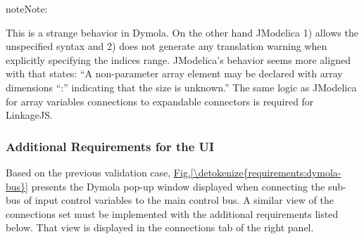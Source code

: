 \documentclass[letterpaper,10pt, openany,english]{sphinxmanual}
\begin{document}
\begin{sphinxadmonition}{note}{Note:}
\begin{sphinxVerbatim}[commandchars=\\\{\}]
 \PYG{p}{[}\PYG{p}{]}

  
\PYG{p}{[}\PYG{p}{]}  
\PYG{p}{[}\PYG{p}{]}  
\PYG{p}{[}\PYG{p}{]} 
\PYG{p}{[}\PYG{p}{]} 
\end{sphinxVerbatim}

This is a strange behavior in Dymola. On the other hand JModelica 1) allows the unspecified \sphinxcode{\sphinxupquote{{[}:{]}}} syntax and 2) does not generate any translation warning when explicitly specifying the indices range.
JModelica’s behavior seems more aligned with   that states: “A non-parameter array element may be declared with array dimensions “:” indicating that the size is unknown.”
The same logic as JModelica for array variables connections to expandable connectors is required for LinkageJS.
\end{sphinxadmonition}


\subsubsection{Additional Requirements for the UI}
\label{\detokenize{requirements:additional-requirements-for-the-ui}}\label{\detokenize{requirements:sec-connect-ui-req}}
Based on the previous validation case, \hyperref[\detokenize{requirements:dymola-bus}]{Fig.\@ \ref{\detokenize{requirements:dymola-bus}}} presents the Dymola pop-up window displayed when connecting the sub-bus of input control variables to the main control bus.
A similar view of the connections set must be implemented with the additional requirements listed below. That view is displayed in the connections tab of the right panel.
\end{document}
